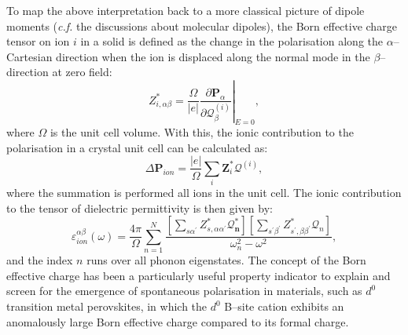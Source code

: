 To map the above interpretation back to a more classical picture of dipole moments (\textit{c.f.} the discussions about molecular dipoles), the Born effective charge tensor on ion $i$ in a solid is defined\cite{ghosez1998dynamical} as the change in the polarisation along the $\alpha$--Cartesian direction when the ion is displaced along the normal mode in the $\beta$--direction at zero field:
\begin{equation}\label{eq:born_charge}
    Z_{i,\alpha\beta}^{*}=\left.\frac{\Omega}{|e|}\frac{\partial \bm{P}_{\alpha}}{\partial \bm{\mathcal{Q}}_\beta^{(i)}}\right\vert_{E=0},
\end{equation}
where $\Omega$ is the unit cell volume. With this, the ionic contribution to the polarisation in a crystal unit cell can be calculated as:
\begin{equation}\label{eq:ionic_pol}
    \Delta\bm{P}_{ion}=\frac{|e|}{\Omega}\sum_{i}\bm{Z}_{i}^{*}\bm{\mathcal{Q}}^{(i)},
\end{equation}
where the summation is performed all ions in the unit cell. The ionic contribution to the tensor of dielectric permittivity is then given by:\cite{gonze1997dynamical}
\begin{equation}\label{eq:ionic_epsilon}
     \varepsilon_{ion}^{\alpha\beta}(\omega)=\frac{4\pi}{\Omega}\sum_{n=1}^N\frac{\left[\sum_{s\alpha^\prime}Z_{s,\alpha\alpha^\prime}^{*}\bm{\mathcal{Q}_n^{*}}\right] \left[\sum_{s^\prime\beta^\prime}Z_{s^\prime,\beta\beta^\prime}^{*}\bm{\mathcal{Q}}_n\right]}{\omega_n^2-\omega^2},
\end{equation}
and the index $n$ runs over all phonon eigenstates. The concept of the Born effective charge has been a particularly useful property indicator to explain and screen for the emergence of spontaneous polarisation in materials, such as $d^0$ transition metal perovskites,\cite{matthias1949new} in which the $d^0$ B--site cation exhibits an anomalously large Born effective charge compared to its formal charge.\cite{armiento2011screening} 


